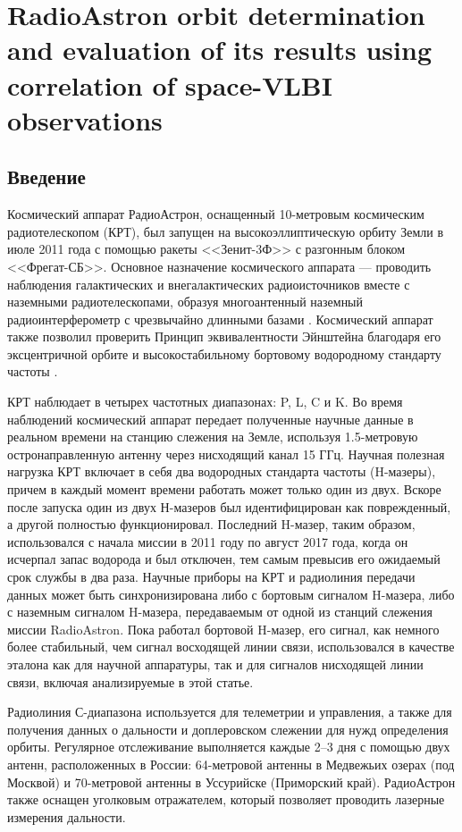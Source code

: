 \section{RadioAstron orbit determination and evaluation of its results using correlation of
space-VLBI observations}

\subsection{Введение}

Космический аппарат РадиоАстрон, оснащенный 10-метровым космическим радиотелескопом (КРТ), был
запущен на высокоэллиптическую орбиту Земли в июле 2011 года с помощью ракеты <<Зенит-3Ф>> с
разгонным блоком <<Фрегат-СБ>>. Основное назначение космического аппарата --- проводить наблюдения
галактических и внегалактических радиоисточников вместе с наземными радиотелескопами, образуя
многоантенный наземный радиоинтерферометр с чрезвычайно длинными базами \cite{Kardashev_2013_rus}.
Космический аппарат также позволил проверить Принцип эквивалентности Эйнштейна благодаря его
эксцентричной орбите и высокостабильному бортовому водородному стандарту частоты
\cite{Litvinov_2018,Nunes_2020}.

КРТ наблюдает в четырех частотных диапазонах: P, L, C и K. Во время наблюдений космический аппарат
передает полученные научные данные в реальном времени на станцию слежения на Земле, используя
1.5-метровую остронаправленную антенну через нисходящий канал 15 ГГц. Научная полезная нагрузка КРТ
включает в себя два водородных стандарта частоты (H-мазеры), причем в каждый момент времени работать
может только один из двух. Вскоре после запуска один из двух Н-мазеров был идентифицирован как
поврежденный, а другой полностью функционировал. Последний H-мазер, таким образом, использовался с
начала миссии в 2011 году по август 2017 года, когда он исчерпал запас водорода и был отключен, тем
самым превысив его ожидаемый срок службы в два раза. Научные приборы на КРТ и радиолиния передачи
данных может быть синхронизирована либо с бортовым сигналом H-мазера, либо с наземным сигналом
H-мазера, передаваемым от одной из станций слежения миссии RadioAstron. Пока работал бортовой
H-мазер, его сигнал, как немного более стабильный, чем сигнал восходящей линии связи, использовался
в качестве эталона как для научной аппаратуры, так и для сигналов нисходящей линии связи, включая
анализируемые в этой статье.

Радиолиния С-диапазона используется для телеметрии и управления, а также для получения данных о
дальности и доплеровском слежении для нужд определения орбиты. Регулярное отслеживание выполняется
каждые 2--3 дня с помощью двух антенн, расположенных в России: 64-метровой антенны в Медвежьих
озерах (под Москвой) и 70-метровой антенны в Уссурийске (Приморский край). РадиоАстрон также оснащен
уголковым отражателем, который позволяет проводить лазерные измерения дальности.

